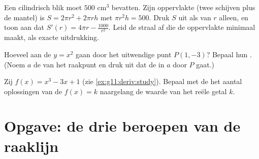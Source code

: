\begin{exercise}[$\star\star$]\label{exo:g11:deriv:10}
Een cilindrisch blik moet $500$ cm$^3$ bevatten. Zijn oppervlakte (twee
schijven plus de mantel) is $S = 2\pi r^2 + 2\pi r h$ met $\pi r^2 h = 500$.
Druk $S$ uit als  van $r$ alleen, en toon aan dat
$S'(r) = 4\pi r - \frac{1000}{r^2}$. Leid de straal af die de oppervlakte
minimaal maakt, als exacte uitdrukking.
\end{exercise}

\begin{exercise}[$\star\star\star$]\label{exo:g11:deriv:11}
Hoeveel  aan de  $y = x^2$ gaan door het uitwendige punt
$P(1, -3)$? Bepaal hun . (Noem $a$ de  van het raakpunt
en druk uit dat de  in $a$ door $P$ gaat.)
\end{exercise}

\begin{exercise}[$\star\star\star$]\label{exo:g11:deriv:12}
Zij $f(x) = x^3 - 3x + 1$ (zie \cref{ex:g11:deriv:study}). Bepaal met de
 het aantal oplossingen van de  $f(x) = k$
naargelang de waarde van het reële getal $k$.
\end{exercise}

\section{Opgave: de drie beroepen van de raaklijn}


